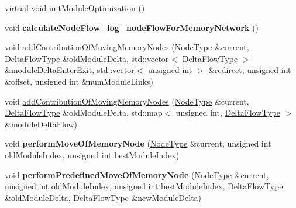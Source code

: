 \begin{DoxyCompactItemize}
\item 
virtual void \mbox{\hyperlink{classInfomapGreedyTypeSpecialized_3_01FlowType_00_01WithMemory_01_4_a3b8cb78e45b8879069d662c3791a702e}{init\+Module\+Optimization}} ()
\item 
\mbox{\label{classInfomapGreedyTypeSpecialized_3_01FlowType_00_01WithMemory_01_4_a347b6825186d798587fdd77a35277a83}} 
void {\bfseries calculate\+Node\+Flow\+\_\+log\+\_\+node\+Flow\+For\+Memory\+Network} ()
\item 
void \mbox{\hyperlink{classInfomapGreedyTypeSpecialized_3_01FlowType_00_01WithMemory_01_4_acde6bc33c277e883e2803d8859dce5f9}{add\+Contribution\+Of\+Moving\+Memory\+Nodes}} (\mbox{\hyperlink{classMemNode}{Node\+Type}} \&current, \mbox{\hyperlink{structMemDeltaFlow}{Delta\+Flow\+Type}} \&old\+Module\+Delta, std\+::vector$<$ \mbox{\hyperlink{structMemDeltaFlow}{Delta\+Flow\+Type}} $>$ \&module\+Delta\+Enter\+Exit, std\+::vector$<$ unsigned int $>$ \&redirect, unsigned int \&offset, unsigned int \&num\+Module\+Links)
\item 
void \mbox{\hyperlink{classInfomapGreedyTypeSpecialized_3_01FlowType_00_01WithMemory_01_4_afce65e489f9881a44582fd56bd76b675}{add\+Contribution\+Of\+Moving\+Memory\+Nodes}} (\mbox{\hyperlink{classMemNode}{Node\+Type}} \&current, \mbox{\hyperlink{structMemDeltaFlow}{Delta\+Flow\+Type}} \&old\+Module\+Delta, std\+::map$<$ unsigned int, \mbox{\hyperlink{structMemDeltaFlow}{Delta\+Flow\+Type}} $>$ \&module\+Delta\+Flow)
\item 
\mbox{\label{classInfomapGreedyTypeSpecialized_3_01FlowType_00_01WithMemory_01_4_a766c0e73cd02f1612ebcd13d8ae1a598}} 
void {\bfseries perform\+Move\+Of\+Memory\+Node} (\mbox{\hyperlink{classMemNode}{Node\+Type}} \&current, unsigned int old\+Module\+Index, unsigned int best\+Module\+Index)
\item 
\mbox{\label{classInfomapGreedyTypeSpecialized_3_01FlowType_00_01WithMemory_01_4_ab09f3531525acae56835f1b49dbc7827}} 
void {\bfseries perform\+Predefined\+Move\+Of\+Memory\+Node} (\mbox{\hyperlink{classMemNode}{Node\+Type}} \&current, unsigned int old\+Module\+Index, unsigned int best\+Module\+Index, \mbox{\hyperlink{structMemDeltaFlow}{Delta\+Flow\+Type}} \&old\+Module\+Delta, \mbox{\hyperlink{structMemDeltaFlow}{Delta\+Flow\+Type}} \&new\+Module\+Delta)

\end{DoxyCompactItemize}
